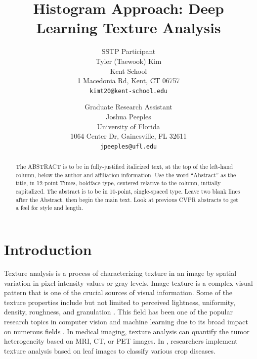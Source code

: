 \documentclass[10pt,twocolumn,letterpaper]{article}
\begin{document}

\title{
	Histogram Approach: Deep Learning Texture Analysis}


\author{SSTP Participant\\
Tyler (Taewook) Kim\\
Kent School\\
1 Macedonia Rd, Kent, CT 06757\\
{\tt\small kimt20@kent-school.edu} 
\and
Graduate Research Assistant\\
Joshua Peeples\\
University of Florida\\
1064 Center Dr, Gainesville, FL 32611\\
{\tt\small jpeeples@ufl.edu}
}

\maketitle

\begin{abstract}
   The ABSTRACT is to be in fully-justified italicized text, at the top
   of the left-hand column, below the author and affiliation
   information. Use the word ``Abstract'' as the title, in 12-point
   Times, boldface type, centered relative to the column, initially
   capitalized. The abstract is to be in 10-point, single-spaced type.
   Leave two blank lines after the Abstract, then begin the main text.
   Look at previous CVPR abstracts to get a feel for style and length.
\end{abstract}


\section{Introduction}
 Texture analysis is a process of characterizing texture in an image by spatial variation in pixel intensity values or gray levels. Image texture is a complex visual pattern that is one of the crucial sources of visual information. Some of the texture properties include but not limited to perceived lightness, uniformity, density, roughness, and granulation \cite{Materka98textureanalysis}. This field has been one of the popular research topics in computer vision and machine learning due to its broad impact on numerous fields \cite{Cavalin2017methods}. In medical imaging, texture analysis can quantify the tumor heterogeneity based on MRI, CT, or PET images. \cite{Nalepa2014medical} In \cite{Pinto2016agri}, researchers implement texture analysis based on leaf images to classify various crop diseases.
\\
\end{document}
